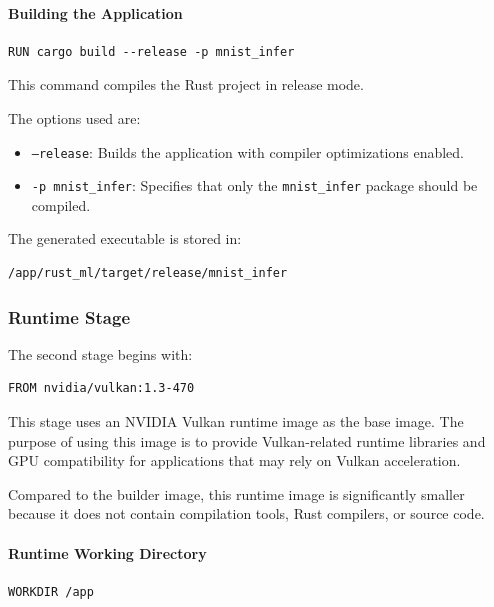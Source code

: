 \documentclass{ieeeaccess}
\begin{document}
\paragraph{Building the Application}

\begin{lstlisting}
RUN cargo build --release -p mnist_infer
\end{lstlisting}

This command compiles the Rust project in release mode.

The options used are:

\begin{itemize}
    \item \texttt{--release}: Builds the application with compiler optimizations enabled.
    \item \texttt{-p mnist\_infer}: Specifies that only the \texttt{mnist\_infer} package should be compiled.
\end{itemize}

The generated executable is stored in:

\begin{lstlisting}
/app/rust_ml/target/release/mnist_infer
\end{lstlisting}

\subsubsection{Runtime Stage}

The second stage begins with:

\begin{lstlisting}
FROM nvidia/vulkan:1.3-470
\end{lstlisting}

This stage uses an NVIDIA Vulkan runtime image as the base image. The purpose of using this image is to provide Vulkan-related runtime libraries and GPU compatibility for applications that may rely on Vulkan acceleration.

Compared to the builder image, this runtime image is significantly smaller because it does not contain compilation tools, Rust compilers, or source code.


\paragraph{Runtime Working Directory}

\begin{lstlisting}
WORKDIR /app
\end{lstlisting}
\end{document}
